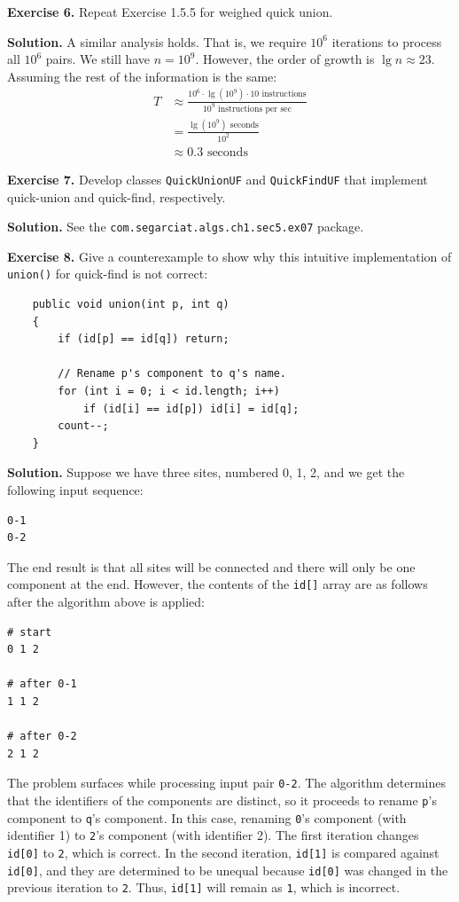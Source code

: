 \documentclass[12pt, a4paper]{article}
\newenvironment{ex}[2][Exercise]
{\par\medskip\noindent \textbf{#1 #2.}}
{\medskip}
\newenvironment{sol}[1][Solution]
{\par\medskip\noindent \textbf{#1.} }
{\medskip}
\begin{document}
	\begin{ex}{6}
		Repeat Exercise 1.5.5 for weighed quick union.
	\end{ex}
	\begin{sol}
		A similar analysis holds. That is, we require $10^6$ iterations to process all $10^6$
		pairs. We still have $n=10^9$. However, the order of growth is $\lg n\approx 23$. Assuming
		the rest of the information is the same:
		\begin{align*}
			T & \approx \frac{10^6\cdot \lg (10^9) \cdot 10 \text{ instructions}}{10^9 \text{ instructions per sec}}\\
			&=\frac{\lg(10^9)\text{ seconds}}{10^2}\\
			&\approx 0.3 \text{ seconds}
		\end{align*}
	\end{sol}
	\begin{ex}{7}
		Develop classes \texttt{QuickUnionUF} and \texttt{QuickFindUF} that implement quick-union
		and quick-find, respectively.
	\end{ex}
	\begin{sol}
		See the \texttt{com.segarciat.algs.ch1.sec5.ex07} package.
	\end{sol}
	\begin{ex}{8}
		Give a counterexample to show why this intuitive implementation of \texttt{union()}
		for quick-find is not correct:
		\begin{lstlisting}
	public void union(int p, int q)
	{
		if (id[p] == id[q]) return;
		
		// Rename p's component to q's name.
		for (int i = 0; i < id.length; i++)
			if (id[i] == id[p]) id[i] = id[q];
		count--;
	}
		\end{lstlisting}
	\end{ex}
	\begin{sol}
		Suppose we have three sites, numbered 0, 1, 2, and we get the following input sequence:
		\begin{lstlisting}[language={}]
0-1
0-2
		\end{lstlisting}
		The end result is that all sites will be connected and there will only be one component
		at the end. However, the contents of the \texttt{id[]} array are as follows after
		the algorithm above is applied:
		\begin{lstlisting}[language={}]
# start
0 1 2

# after 0-1
1 1 2

# after 0-2
2 1 2
		\end{lstlisting}
		The problem surfaces while processing input pair \texttt{0-2}. The algorithm determines
		that the identifiers of the components are distinct, so it proceeds to rename
		\texttt{p}'s component to \texttt{q}'s component. In this case, renaming \texttt{0}'s
		component (with identifier 1) to \texttt{2}'s component (with identifier 2). The
		first iteration changes \texttt{id[0]} to \texttt{2}, which is correct. In the second
		iteration, \texttt{id[1]} is compared against \texttt{id[0]}, and they are determined
		to be unequal because \texttt{id[0]} was changed in the previous iteration to \texttt{2}.
		Thus, \texttt{id[1]} will remain as \texttt{1}, which is incorrect.
	\end{sol}
\end{document}
